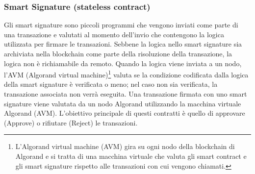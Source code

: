 \subsubsection{Smart Signature (stateless contract)}
Gli smart signature sono piccoli programmi che vengono inviati come parte di una transazione e valutati al momento dell'invio che contengono la logica utilizzata per firmare le transazioni. Sebbene la logica nello smart signature sia archiviata nella blockchain come parte della risoluzione della transazione, la logica non è richiamabile da remoto. Quando la logica viene inviata a un nodo, l'AVM (Algorand virtual machine)\footnote{L'Algorand virtual machine (AVM) gira su ogni nodo della blockchain di Algorand e si tratta di una macchina virtuale che valuta gli smart contract e gli smart signature rispetto alle transazioni con cui vengono chiamati.} valuta se la condizione codificata dalla logica della smart signature è verificata o meno; nel caso non sia verificata, la transazione associata non verrà eseguita. Una transazione firmata con uno smart signature viene valutata da un nodo Algorand utilizzando la macchina virtuale Algorand (AVM). L'obiettivo principale di questi contratti è quello di approvare (Approve) o rifiutare (Reject) le transazioni.

